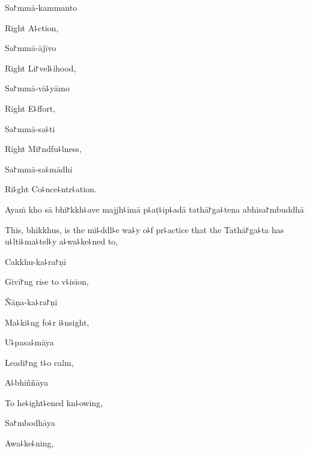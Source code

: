 \ifaivedition
\clearpage
\fi

Sa꜓mmā-kammanto

\begin{english}
  Right A꜕ction,
\end{english}

Sa꜓mmā-ājīvo

\begin{english}
  Right Li꜓vel꜕ihood,
\end{english}

Sa꜓mmā-vā꜕yāmo

\begin{english}
  Right E꜕ffort,
\end{english}

Sa꜓mmā-sa꜕ti

\begin{english}
  Right Mi꜓ndfu꜕lness,
\end{english}

Sa꜓mmā-sa꜕mādhi

\begin{english}
  Ri꜕ght Co꜕nce꜕ntr꜕ation.
\end{english}

Ayaṁ kho sā bhi꜓kkh꜕ave majjh꜕imā p꜕aṭ꜕ip꜕adā tathā꜓ga꜕tena abhisa꜓mbuddhā

\begin{english}
  This, bhikkhus, is the mi꜕ddl꜕e wa꜕y o꜕f pr꜕actice that the
  Tathā꜓ga꜕ta has u꜕lti꜕ma꜕tel꜕y a꜕wa꜕ke꜕ned to,
\end{english}

Cakkhu-ka꜕ra꜓ṇī

\begin{english}
  Givi꜓ng rise to v꜕ision,
\end{english}

Ñāṇa-ka꜕ra꜓ṇī

\begin{english}
  Ma꜕ki꜕ng fo꜕r i꜕nsight,
\end{english}

U꜕pasa꜕māya

\begin{english}
  Leadi꜓ng t꜕o calm,
\end{english}

A꜕bhiññāya

\begin{english}
  To he꜕ight꜕ened kn꜕owing,
\end{english}

Sa꜓mbodhāya

\begin{english}
  Awa꜕ke꜕ning,
\end{english}

